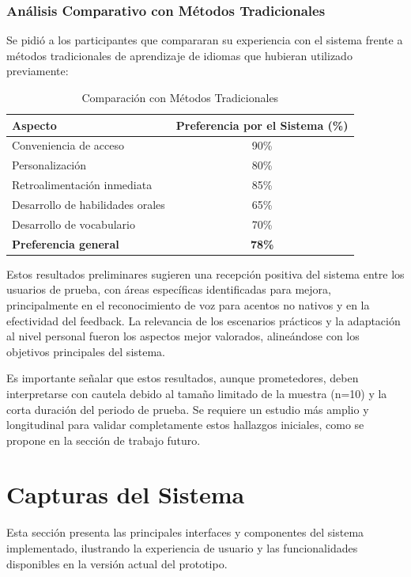 \subsubsection{Análisis Comparativo con Métodos Tradicionales}
\label{subsubsec:comparacion_metodos}

Se pidió a los participantes que compararan su experiencia con el sistema frente a métodos tradicionales de aprendizaje de idiomas que hubieran utilizado previamente:

\begin{table}[h]
\centering
\caption{Comparación con Métodos Tradicionales}
\label{table:comparacion_metodos}
\begin{tabular}{|l|c|}
\hline
\textbf{Aspecto} & \textbf{Preferencia por el Sistema (\%)} \\
\hline
Conveniencia de acceso & 90\% \\
\hline
Personalización & 80\% \\
\hline
Retroalimentación inmediata & 85\% \\
\hline
Desarrollo de habilidades orales & 65\% \\
\hline
Desarrollo de vocabulario & 70\% \\
\hline
\textbf{Preferencia general} & \textbf{78\%} \\
\hline
\end{tabular}
\end{table}

Estos resultados preliminares sugieren una recepción positiva del sistema entre los usuarios de prueba, con áreas específicas identificadas para mejora, principalmente en el reconocimiento de voz para acentos no nativos y en la efectividad del feedback. La relevancia de los escenarios prácticos y la adaptación al nivel personal fueron los aspectos mejor valorados, alineándose con los objetivos principales del sistema.

Es importante señalar que estos resultados, aunque prometedores, deben interpretarse con cautela debido al tamaño limitado de la muestra (n=10) y la corta duración del periodo de prueba. Se requiere un estudio más amplio y longitudinal para validar completamente estos hallazgos iniciales, como se propone en la sección de trabajo futuro.

\section{Capturas del Sistema}
\label{capturas-sistema}

Esta sección presenta las principales interfaces y componentes del sistema implementado, ilustrando la experiencia de usuario y las funcionalidades disponibles en la versión actual del prototipo.

